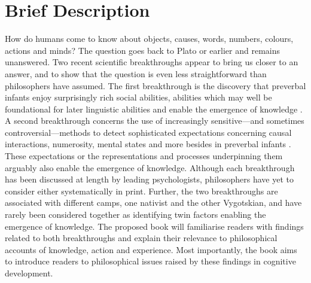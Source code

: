 \documentclass[12pt,\papersize]{extarticle}
\date{}
\begin{document}
\setlength\footnotesep{1em}




\maketitle

\setcounter{secnumdepth}{-1} 



\section{Brief Description}
How do humans come to know about %
objects,
causes,
words,
numbers,
colours,
actions
and
minds? 
The question goes back to Plato or earlier and remains unanswered.
Two recent scientific breakthroughs appear to bring us closer to an answer, and to show that the question is even less straightforward than philosophers have  assumed.
The first breakthrough is the discovery that preverbal infants enjoy surprisingly rich social abilities, abilities which
may well be foundational for later linguistic abilities and enable the emergence of knowledge \citep[e.g.][]{Csibra:2009xr,Meltzoff:2007pj,Tomasello:2005wx}. 
A second breakthrough concerns the use of increasingly sensitive---and sometimes controversial---methods to detect  sophisticated expectations concerning  causal interactions, numerosity, mental states and more besides in preverbal infants \citep[e.g.][]{Spelke:1990jn,Baillargeon:gx}.
These expectations or the representations and processes underpinning them arguably also enable the emergence of knowledge. 
Although each breakthrough has been discussed at length by leading psychologists, philosophers have yet to consider either systematically in print.
Further, the two breakthroughs are associated with different camps, one nativist and the other Vygotskian, and have rarely been considered together as identifying twin factors enabling the emergence of knowledge.
The proposed book will familiarise readers with findings related to both breakthroughs and explain their relevance to philosophical accounts of knowledge, action and experience.  
Most importantly, the book aims to introduce readers to  philosophical issues raised by these findings in cognitive development.
\end{document}
